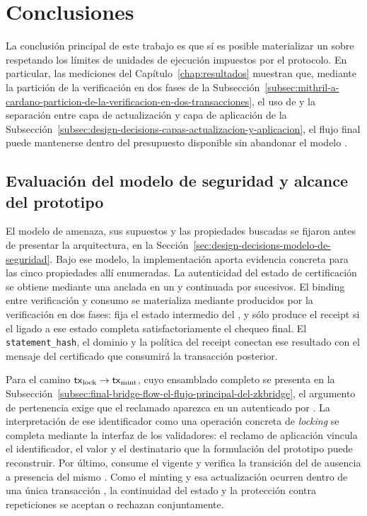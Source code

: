 
\section{Conclusiones}
\label{sec:conclusions-and-future-work-conclusiones}

La conclusión principal de este trabajo es que sí es posible materializar un \zkBridge sobre \Cardano respetando los límites de unidades de ejecución impuestos por el protocolo. En particular, las mediciones del Capítulo~\ref{chap:resultados} muestran que, mediante la partición de la verificación \STM en dos fases de la Subsección~\ref{subsec:mithril-a-cardano-particion-de-la-verificacion-en-dos-transacciones}, el uso de \ReferenceScripts y la separación entre capa de actualización y capa de aplicación de la Subsección~\ref{subsec:design-decisions-capas-actualizacion-y-aplicacion}, el flujo final puede mantenerse dentro del presupuesto \Onchain disponible sin abandonar el modelo \eUTxO.

\subsection{Evaluación del modelo de seguridad y alcance del prototipo}
\label{subsec:conclusions-and-future-work-modelo-de-seguridad-y-alcance-del-prototipo}

El modelo de amenaza, sus supuestos y las propiedades buscadas se fijaron antes de presentar la arquitectura, en la Sección~\ref{sec:design-decisions-modelo-de-seguridad}. Bajo ese modelo, la implementación aporta evidencia concreta para las cinco propiedades allí enumeradas. La autenticidad del estado de certificación se obtiene mediante una \CertificateChain anclada en un \GenesisCertificate y continuada por \StakeDistributionUTxO sucesivos. El binding entre verificación y consumo se materializa mediante \ProofReceipt producidos por la verificación \STM en dos fases: \PhaseOneSetupTx fija el estado intermedio del \transcript, y \PhaseTwoVerifyTx sólo produce el receipt si el \ReducedRedeemer ligado a ese estado completa satisfactoriamente el chequeo final. El \texttt{statement\_hash}, el dominio y la política del receipt conectan ese resultado con el mensaje del certificado que consumirá la transacción posterior.

Para el camino $\mathsf{tx}_{\mathrm{lock}} \rightarrow \mathsf{tx}_{\mathrm{mint}}$, cuyo ensamblado completo se presenta en la Subsección~\ref{subsec:final-bridge-flow-el-flujo-principal-del-zkbridge}, el argumento de pertenencia exige que el \TxId reclamado aparezca en un \TransactionSnapshot autenticado por \Mithril. La interpretación de ese identificador como una operación concreta de \textit{locking} se completa mediante la interfaz de los validadores: el reclamo de aplicación vincula el identificador, el valor y el destinatario que la formulación del prototipo puede reconstruir. Por último, \MintTx consume el \TxsUpdaterUTxO vigente y verifica la transición del \SMT de ausencia a presencia del mismo \TxId. Como el minting y esa actualización ocurren dentro de una única transacción \eUTxO, la continuidad del estado y la protección contra repeticiones se aceptan o rechazan conjuntamente.


